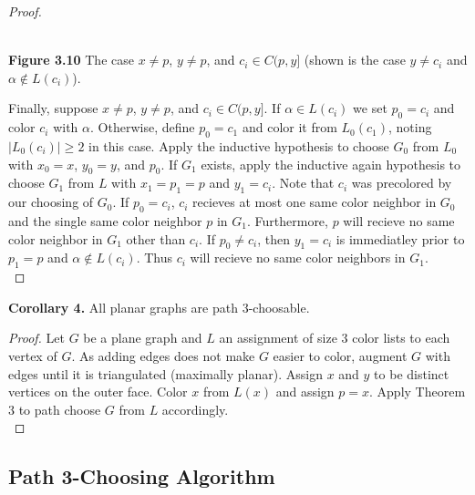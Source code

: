 \documentclass[11pt,letter]{article}
\begin{document}
\begin{proof}
\begin{center}
\hfill\\
\textbf{Figure 3.10} The case $x\ne p$, $y\ne p$, and $c_i\in C(p,y]$ (shown is the case $y\ne c_i$ and
$\alpha\not\in L(c_i)$).
\end{center}

\noindent Finally, suppose $x\ne p$, $y\ne p$, and $c_i\in C(p,y]$. If
$\alpha\in L(c_i)$ we set $p_0=c_i$ and color $c_i$ with $\alpha$. Otherwise, define $p_0=c_1$ and color it from
$L_0(c_1)$, noting $|L_0(c_i)|\ge 2$ in this case. Apply the inductive hypothesis to
choose $G_0$ from $L_0$ with $x_0=x$, $y_0=y$, and $p_0$. If $G_1$ exists, apply the inductive again
hypothesis to choose $G_1$ from $L$ with $x_1=p_1=p$ and $y_1=c_i$. Note that $c_i$ was precolored by our
choosing of $G_0$. If $p_0=c_i$, $c_i$ recieves at most one same
color neighbor in $G_0$ and the single same color neighbor $p$ in $G_1$. Furthermore, $p$ will recieve no
same color neighbor in $G_1$ other than $c_i$. If $p_0\ne c_i$, then $y_1=c_i$ is immediatley prior to
$p_1=p$ and $\alpha\not\in L(c_i)$. Thus $c_i$ will recieve no same color neighbors in $G_1$.\\
\end{proof}

\begin{adjustwidth}{1.5em}{1.5em}
\noindent\textbf{Corollary 4.} All planar graphs are path $3$-choosable.\\
\end{adjustwidth}

\begin{proof}
Let $G$ be a plane graph and $L$ an assignment of size $3$ color lists to each vertex of $G$. As adding edges does
not make $G$ easier to color, augment $G$ with edges until it is triangulated (maximally planar).
Assign $x$ and $y$ to be distinct vertices on the outer face. Color $x$ from $L(x)$
and assign $p=x$. Apply Theorem 3 to path choose $G$ from $L$ accordingly.\\
\end{proof}

\subsection*{Path 3-Choosing Algorithm}
\end{document}
